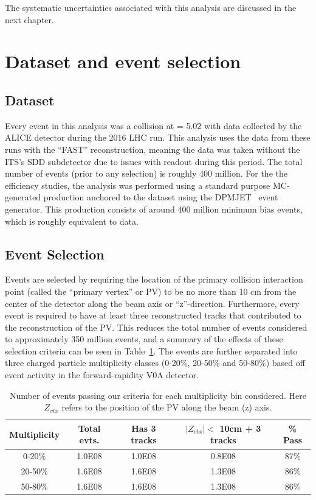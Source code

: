 The systematic uncertainties associated with this analysis are discussed in the next chapter.



\section{Dataset and event selection}
\label{sec:event_selection}

\subsection{Dataset}

Every event in this analysis was a \pPb collision at \snn = 5.02 \TeV with data collected by the ALICE detector during the 2016 LHC run. This analysis uses the data from these runs with the ``FAST'' reconstruction, meaning the data was taken without the ITS's SDD subdetector due to issues with readout during this period. The total number of events (prior to any selection) is roughly 400 million. For the the efficiency studies, the analysis was performed using a standard purpose MC-generated production anchored to the dataset using the DPMJET~\cite{DPMJET} event generator. This production consists of around 400 million minimum bias events, which is roughly equivalent to data.

\subsection{Event Selection}

Events are selected by requiring the location of the primary collision interaction point (called the ``primary vertex'' or PV) to be no more than 10 cm from the center of the detector along the beam axis or ``z''-direction. Furthermore, every event is required to have at least three reconstructed tracks that contributed to the reconstruction of the PV. This reduces the total number of events considered to approximately 350 million events, and a summary of the effects of these selection criteria can be seen in Table~\ref{tab:event_table}. The events are further separated into three charged particle multiplicity classes (0-20\%, 20-50\% and 50-80\%) based off event activity in the forward-rapidity V0A detector.

\begin{table}[h!]
    \centering
	\caption{Number of events passing our criteria for each multiplicity bin considered. Here $Z_{vtx}$ refers to the position of the PV along the beam (z) axis.}
	\label{tab:event_table}
	\begin{tabular}{| c | c | c | c || c | }
		\hline
		Multiplicity & Total evts. & Has 3 tracks & $|Z_{vtx}| <$  10cm + 3 tracks & \% Pass \\
		\hline
		0-20\% & 1.0E08 & 1.0E08 & 0.8E08 & 87\%\\
		20-50\% & 1.6E08 & 1.6E08 & 1.3E08 & 86\%\\
		50-80\% & 1.6E08 & 1.6E08 & 1.3E08 & 86\%\\
		\hline
	\end{tabular}
\end{table}



